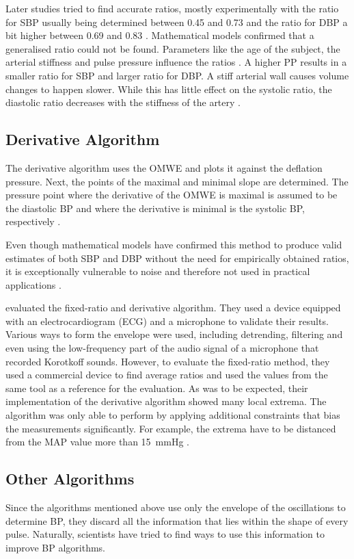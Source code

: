 Later studies tried to find accurate ratios, mostly experimentally with the ratio for SBP usually being determined between 0.45 and 0.73 and the ratio for DBP a bit higher between 0.69 and 0.83 \citep{Drzewiecki1994, Forouzanfar2015}. Mathematical models confirmed that a generalised ratio could not be found. Parameters like the age of the subject, the arterial stiffness and pulse pressure influence the ratios \cite{Ursino1996}. A higher PP results in a smaller ratio for SBP and larger ratio for DBP. A stiff arterial wall causes volume changes to happen slower. While this has little effect on the systolic ratio, the diastolic ratio decreases with the stiffness of the artery \citep{Babbs2012}.

\subsection{Derivative Algorithm} \label{sec:der}
The derivative algorithm uses the OMWE and plots it against the deflation pressure. Next, the points of the maximal and minimal slope are determined. The pressure point where the derivative of the OMWE is maximal is assumed to be the diastolic BP and where the derivative is minimal is the systolic BP, respectively \citep{Jazbinsek2010, Forouzanfar2015}.

Even though mathematical models have confirmed this method to produce valid estimates of both SBP and DBP without the need for empirically obtained ratios, it is exceptionally vulnerable to noise and therefore not used in practical applications \citep{Babbs2012, Chandrasekhar2019}.

\citet{Jazbinsek2010} evaluated the fixed-ratio and derivative algorithm. They used a device equipped with an electrocardiogram (ECG) and a microphone to validate their results. Various ways to form the envelope were used, including detrending, filtering and even using the low-frequency part of the audio signal of a microphone that recorded Korotkoff sounds. However, to evaluate the fixed-ratio method, they used a commercial device to find average ratios and used the values from the same tool as a reference for the evaluation. As was to be expected, their implementation of the derivative algorithm showed many local extrema. The algorithm was only able to perform by applying additional constraints that bias the measurements significantly. For example, the extrema have to be distanced from the MAP value more than \SI{15}{\mmHg} \citep{Jazbinsek2010, Jazbinsek2005}.


\subsection{Other Algorithms}
Since the algorithms mentioned above use only the envelope of the oscillations to determine BP, they discard all the information that lies within the shape of every pulse. Naturally, scientists have tried to find ways to use this information to improve BP algorithms.

